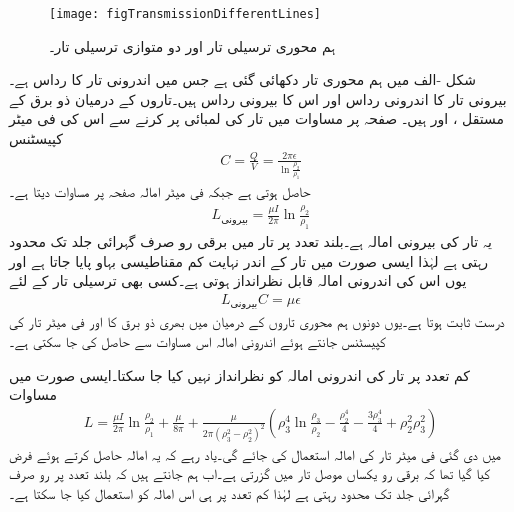 \begin{figure}
\centering
\texttt{[image: figTransmissionDifferentLines]}
\caption{ہم محوری ترسیلی تار اور دو متوازی ترسیلی تار۔}
\label{شکل_ترسیل_مختلف_ترسیلی_تار}
\end{figure}
شکل -الف میں ہم محوری تار دکھائی گئی ہے جس میں اندرونی تار کا رداس  ہے۔بیرونی تار کا اندرونی رداس  اور اس کا بیرونی رداس  ہیں۔تاروں کے درمیان ذو برق کے مستقل ،   اور  ہیں۔ صفحہ  پر مساوات میں تار کی لمبائی  پر کرنے سے اس کی فی میٹر کپیسٹنس
 \begin{align}
C=\frac{Q}{V}=\frac{2\pi\epsilon }{\ln \frac{\rho_2}{\rho_1}}
\end{align}
حاصل ہوتی ہے جبکہ فی میٹر امالہ صفحہ  پر مساوات  دیتا ہے۔
\begin{align}
L_{\text{بیرونی}}=\frac{\mu  I }{2\pi} \ln \frac{\rho_2}{\rho_1}
\end{align}
یہ تار کی بیرونی امالہ ہے۔بلند تعدد پر تار میں برقی رو صرف گہرائی جلد تک محدود رہتی ہے لہٰذا ایسی صورت میں تار کے اندر نہایت کم مقناطیسی بہاو پایا جاتا ہے اور یوں اس کی  اندرونی امالہ قابل نظرانداز ہوتی ہے۔کسی بھی ترسیلی تار کے لئے
\begin{align}\label{مساوات_ترسیلی_امالہ_کپیسٹنس_عمومی_تعلق}
L_{\text{بیرونی}} C=\mu \epsilon
\end{align}
درست ثابت ہوتا ہے۔یوں دونوں ہم محوری تاروں کے درمیان  میں بھری ذو برق کا  اور فی میٹر تار کی کپیسٹنس جانتے ہوئے اندرونی امالہ اس مساوات سے حاصل کی جا سکتی ہے۔

کم تعدد پر تار کی اندرونی امالہ کو نظرانداز نہیں کیا جا سکتا۔ایسی صورت میں مساوات 
\begin{align}\label{مساوات_ترسیلی_کم_تعددی_امالہ}
L=\frac{\mu  I }{2\pi} \ln \frac{\rho_2}{\rho_1}+\frac{\mu }{8\pi}+\frac{\mu}{2\pi \left(\rho_3^2-\rho_2^2\right)^2}\left(\rho_3^4 \ln \frac{\rho_3}{\rho_2}-\frac{\rho_2^4}{4}-\frac{3\rho_3^4}{4}+\rho_2^2 \rho_3^2\right)
\end{align}
میں دی گئی فی میٹر تار کی امالہ استعمال کی جائے گی۔یاد رہے کہ یہ امالہ حاصل کرتے ہوئے فرض کیا گیا تھا کہ برقی رو یکساں موصل تار میں گزرتی ہے۔اب ہم جانتے ہیں کہ بلند تعدد پر رو صرف گہرائی جلد تک محدود رہتی ہے لہٰذا کم تعدد پر ہی اس امالہ کو استعمال کیا جا سکتا ہے۔

